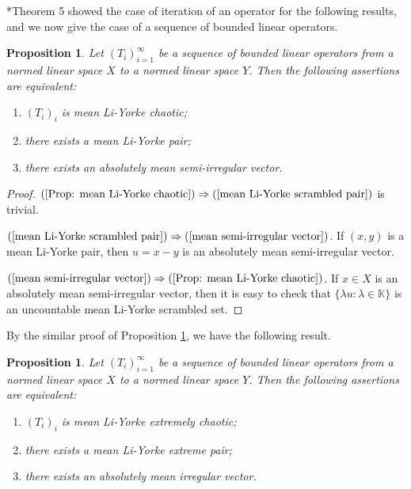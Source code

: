\documentclass[12pt,a4paper]{amsart}
\theoremstyle{definition}
\theoremstyle{plain}
\newtheorem{prop}[defn]{Proposition}
\begin{document}
\cite{BBP2020}*{Theorem 5} showed the case of iteration of an operator for the following results, and we now give the case of a sequence of bounded linear operators.

\begin{prop} \label{mean Li-Yorke-pair-vector}
    Let $(T_i)_{i=1}^{\infty}$ be a sequence of bounded linear operators from a normed linear space $X$ to a normed linear space $Y$. Then the following assertions are equivalent:
    \begin{enumerate}
        \item \label{Prop: mean Li-Yorke chaotic}
        $(T_i)_i$ is mean Li-Yorke chaotic;
        \item \label{mean Li-Yorke scrambled pair}
        there exists a mean Li-Yorke pair;
        \item \label{mean semi-irregular vector}
        there exists an absolutely mean semi-irregular vector.
    \end{enumerate}
\end{prop}

\begin{proof}
    $(\ref{Prop: mean Li-Yorke chaotic}) \Rightarrow (\ref{mean Li-Yorke scrambled pair})$ is trivial.

    $(\ref{mean Li-Yorke scrambled pair}) \Rightarrow (\ref{mean semi-irregular vector})$. 
    If $(x,y)$ is a mean Li-Yorke pair, then $u=x-y$ is an absolutely mean semi-irregular vector.

    $(\ref{mean semi-irregular vector}) \Rightarrow (\ref{Prop: mean Li-Yorke chaotic})$. If $x\in X$ is an absolutely mean semi-irregular vector, then it is easy to check that
    $\{\lambda u: \lambda\in \mathbb{K}\}$ is an uncountable mean Li-Yorke scrambled set.
\end{proof}

By the similar proof of Proposition \ref{mean Li-Yorke-pair-vector}, we have the following result.
\begin{prop}
    Let $(T_i)_{i=1}^{\infty}$ be a sequence of bounded linear operators from a normed linear space $X$ to a normed linear space $Y$. Then the following assertions are equivalent:
    \begin{enumerate}
        \item $(T_i)_i$ is mean Li-Yorke extremely chaotic;
        \item there exists a mean Li-Yorke extreme pair;
        \item there exists an absolutely mean irregular vector.
    \end{enumerate}
\end{prop}
\end{document}
